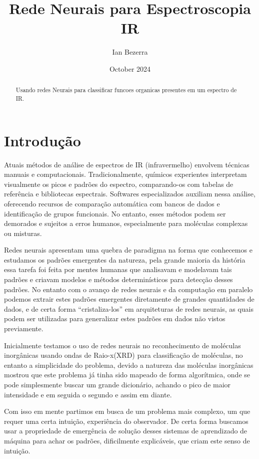 \documentclass[11pt,a4paper]{article}
\title{Rede Neurais para Espectroscopia IR}
\author{Ian Bezerra}
\date{October 2024}
\begin{document}
\maketitle


\begin{abstract}
    Usando redes Neurais para classificar funcoes organicas presentes em um espectro de IR.
\end{abstract}

\section{Introdução}
Atuais métodos de análise de espectros de IR (infravermelho) envolvem técnicas manuais e computacionais. Tradicionalmente, químicos experientes interpretam visualmente os picos e padrões do espectro, comparando-os com tabelas de referência e bibliotecas espectrais. Softwares especializados auxiliam nessa análise, oferecendo recursos de comparação automática com bancos de dados e identificação de grupos funcionais. No entanto, esses métodos podem ser demorados e sujeitos a erros humanos, especialmente para moléculas complexas ou misturas. 

Redes neurais apresentam uma quebra de paradigma na forma que conhecemos e estudamos os padrões emergentes da natureza, pela grande maioria da história essa tarefa foi feita por mentes humanas que analisavam e modelavam tais padrões e criavam modelos e métodos determinísticos para detecção desses padrões. No entanto com o avanço de redes neurais e da computação em paralelo podemos extrair estes padrões emergentes diretamente de grandes quantidades de dados, e de certa forma “cristaliza-los” em arquiteturas de redes neurais, as quais podem ser utilizadas para generalizar estes padrões em dados não vistos previamente.

Inicialmente testamos o uso de redes neurais no reconhecimento de moléculas inorgânicas usando ondas de Raio-x(XRD) para classificação de moléculas, no entanto a simplicidade do problema, devido a natureza das moléculas inorgânicas mostrou que este problema já tinha sido mapeado de forma algorítmica, onde se pode simplesmente buscar um grande dicionário, achando o pico de maior intensidade e em seguida o segundo e assim em diante.

Com isso em mente partimos em busca de um problema mais complexo, um que requer uma certa intuição, experiência do observador. De certa forma buscamos usar a propriedade de emergência de solução desses sistemas de aprendizado de máquina para achar os padrões, dificilmente explicáveis, que criam este senso de intuição.
\end{document}
